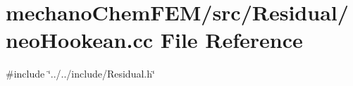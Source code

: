 \section{mechano\+Chem\+F\+E\+M/src/\+Residual/neo\+Hookean.cc File Reference}
\label{neo_hookean_8cc}
{\ttfamily \#include \char`\"{}../../include/\+Residual.\+h\char`\"{}}\newline

